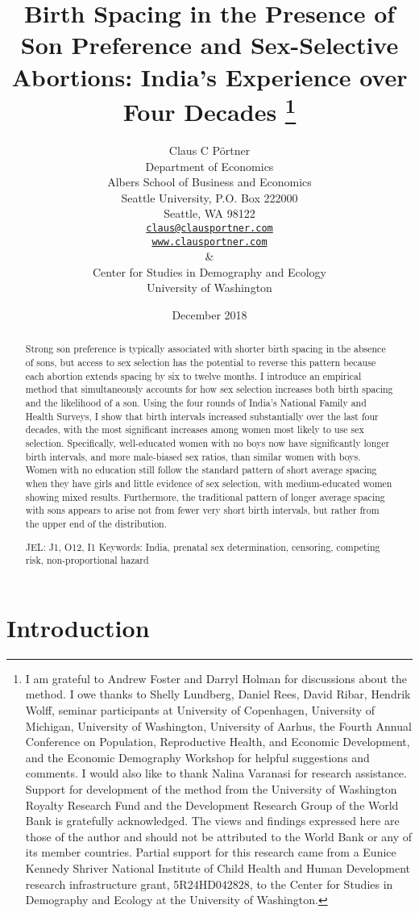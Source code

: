 \documentclass[12pt,letterpaper]{article}
\title{Birth Spacing in the Presence of Son Preference and Sex-Selective Abortions:
India's Experience over Four Decades%
\protect\thanks{%
I am grateful to Andrew Foster and Darryl Holman for discussions about the method.
I owe thanks to Shelly Lundberg, Daniel Rees, David Ribar, 
Hendrik Wolff, seminar participants at University of Copenhagen, University of Michigan, 
University of Washington, University of Aarhus, the Fourth 
Annual Conference on Population, Reproductive Health, 
and Economic Development, and the Economic Demography Workshop for helpful 
suggestions and comments.
I would also like to thank Nalina Varanasi for research assistance.
Support for development of the method from the University of Washington Royalty 
Research Fund and the Development Research Group of the World Bank is gratefully 
acknowledged.
The views and findings expressed here are those of the author and
should not be attributed to the World Bank or any of its member countries.
Partial support for this research came from a Eunice Kennedy Shriver National
Institute of Child Health and Human Development research infrastructure grant,
5R24HD042828, to the Center for Studies in Demography and Ecology at the
University of Washington.
}
}
\author{Claus C P\"ortner\\
    Department of Economics\\
    Albers School of Business and Economics\\
    Seattle University, P.O. Box 222000\\
    Seattle, WA 98122\\
    \href{mailto:claus@clausportner.com}{\texttt{claus@clausportner.com}}\\
    \href{http://www.clausportner.com}{\texttt{www.clausportner.com}}\\
    \& \\
    Center for Studies in Demography and Ecology \\
    University of Washington\\ \vspace{2cm}
    }
\date{December 2018}
\begin{document}
\graphicspath{{../figures/}}

\setcounter{page}{-1}
\maketitle
\thispagestyle{empty}



\newpage
\thispagestyle{empty}
\doublespacing

\begin{abstract}

\noindent 
Strong son preference is typically associated with shorter birth spacing in the absence of 
sons, but access to sex selection has the potential to reverse this pattern because each 
abortion extends spacing by six to twelve months. 
I introduce an empirical method that simultaneously accounts for how sex selection 
increases both birth spacing and the likelihood of a son. 
Using the four rounds of India's National Family and Health Surveys, I show that birth 
intervals increased substantially over the last four decades, with the most significant
increases among women most likely to use sex selection.
Specifically, well-educated women with no boys now have significantly longer birth
intervals, and more male-biased sex ratios, than similar women with boys. 
Women with no education still follow the standard pattern of short average spacing when 
they have girls and little evidence of sex selection, with medium-educated women showing 
mixed results.
Furthermore, the traditional pattern of longer average spacing with sons appears to arise 
not from fewer very short birth intervals, but rather from the upper end of the distribution.


\noindent JEL: J1, O12, I1
\noindent Keywords: India, prenatal sex determination, censoring, competing risk, non-proportional hazard
\end{abstract}

\newpage



\section{Introduction\label{sec:intro}}
\end{document}
